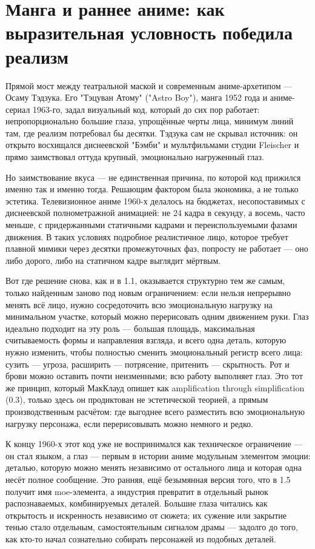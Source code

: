 \section{Манга и раннее аниме: как выразительная условность победила реализм}

Прямой мост между театральной маской и современным аниме-архетипом — Осаму Тэдзука. Его "Тэцуван Атому" ("Astro Boy"), манга 1952 года и аниме-сериал 1963-го, задал визуальный код, который до сих пор работает: непропорционально большие глаза, упрощённые черты лица, минимум линий там, где реализм потребовал бы десятки. Тэдзука сам не скрывал источник: он открыто восхищался диснеевской "Бэмби" и мультфильмами студии Fleischer и прямо заимствовал оттуда крупный, эмоционально нагруженный глаз.

Но заимствование вкуса — не единственная причина, по которой код прижился именно так и именно тогда. Решающим фактором была экономика, а не только эстетика. Телевизионное аниме 1960-х делалось на бюджетах, несопоставимых с диснеевской полнометражной анимацией: не 24 кадра в секунду, а восемь, часто меньше, с придержанными статичными кадрами и переиспользуемыми фазами движения. В таких условиях подробное реалистичное лицо, которое требует плавной мимики через десятки промежуточных фаз, попросту не работает — оно либо дорого, либо на статичном кадре выглядит мёртвым.

Вот где решение снова, как и в 1.1, оказывается структурно тем же самым, только найденным заново под новым ограничением: если нельзя непрерывно менять всё лицо, нужно сосредоточить всю эмоциональную нагрузку на минимальном участке, который можно перерисовать одним движением руки. Глаз идеально подходит на эту роль — большая площадь, максимальная считываемость формы и направления взгляда, и всего одна деталь, которую нужно изменить, чтобы полностью сменить эмоциональный регистр всего лица: сузить — угроза, расширить — потрясение, притенить — скрытность. Рот и брови можно оставить почти неизменными; всю работу выполняет глаз. Это тот же принцип, который МакКлауд опишет как amplification through simplification (0.3), только здесь он продиктован не эстетической теорией, а прямым производственным расчётом: где выгоднее всего разместить всю эмоциональную нагрузку персонажа, если перерисовывать можно немного и редко.

К концу 1960-х этот код уже не воспринимался как техническое ограничение — он стал языком, а глаз — первым в истории аниме модульным элементом эмоции: деталью, которую можно менять независимо от остального лица и которая одна несёт полное сообщение. Это ранняя, ещё безымянная версия того, что в 1.5 получит имя moe-элемента, а индустрия превратит в отдельный рынок распознаваемых, комбинируемых деталей. Большие глаза читались как открытость и искренность независимо от сюжета; их сужение или закрытие тенью стало отдельным, самостоятельным сигналом драмы — задолго до того, как кто-то начал сознательно собирать персонажей из подобных деталей.
